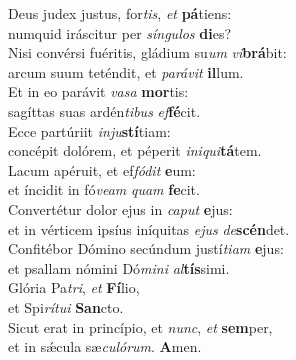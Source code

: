 \evenverse Deus judex justus, for\textit{tis}, \textit{et} \textbf{pá}tiens:~\*\\
\evenverse numquid iráscitur per \textit{sín}\textit{gu}\textit{los} \textbf{di}es?\\
\oddverse Nisi convérsi fuéritis, gládium su\textit{um} \textit{vi}\textbf{brá}bit:~\*\\
\oddverse arcum suum teténdit, et \textit{pa}\textit{rá}\textit{vit} \textbf{il}lum.\\
\evenverse Et in eo parávit \textit{va}\textit{sa} \textbf{mor}tis:~\*\\
\evenverse sagíttas suas ardén\textit{ti}\textit{bus} \textit{ef}\textbf{fé}cit.\\
\oddverse Ecce partúriit \textit{in}\textit{ju}\textbf{stí}tiam:~\*\\
\oddverse concépit dolórem, et péperit \textit{i}\textit{ni}\textit{qui}\textbf{tá}tem.\\
\evenverse Lacum apéruit, et ef\textit{fó}\textit{dit} \textbf{e}um:~\*\\
\evenverse et íncidit in fó\textit{ve}\textit{am} \textit{quam} \textbf{fe}cit.\\
\oddverse Convertétur dolor ejus in \textit{ca}\textit{put} \textbf{e}jus:~\*\\
\oddverse et in vérticem ipsíus iníquitas \textit{e}\textit{jus} \textit{de}\textbf{scén}det.\\
\evenverse Confitébor Dómino secúndum justí\textit{ti}\textit{am} \textbf{e}jus:~\*\\
\evenverse et psallam nómini Dó\textit{mi}\textit{ni} \textit{al}\textbf{tís}simi.\\
\oddverse Glória Pa\textit{tri}, \textit{et} \textbf{Fí}lio,~\*\\
\oddverse et Spi\textit{rí}\textit{tu}\textit{i} \textbf{San}cto.\\
\evenverse Sicut erat in princípio, et \textit{nunc}, \textit{et} \textbf{sem}per,~\*\\
\evenverse et in sǽcula sæ\textit{cu}\textit{ló}\textit{rum}. \textbf{A}men.\\
